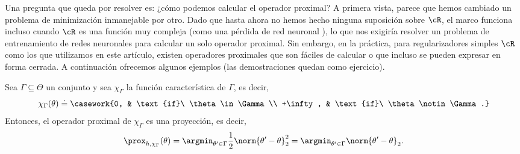 \documentclass[../../book-main_es.tex]{subfiles}
\begin{document}
Una pregunta que queda por resolver es: ¿cómo podemos calcular el operador proximal? A primera
vista, parece que hemos cambiado un problema de minimización inmanejable por
otro. Dado que hasta ahora no hemos hecho ninguna suposición sobre \(\cR\), el marco
funciona incluso cuando \(\cR\) es una función muy compleja (como una pérdida de red neuronal
), lo que nos exigiría resolver un problema de entrenamiento de redes neuronales
para calcular un solo operador proximal. Sin embargo, en la práctica, para
regularizadores simples \(\cR\) como los que utilizamos en este artículo, existen
operadores proximales que son fáciles de calcular o que incluso se 
pueden expresar en forma cerrada. A continuación ofrecemos
algunos ejemplos (las demostraciones quedan como ejercicio).

\begin{example}\label{example:prox-of-characteristic-function}
    Sea \(\Gamma \subseteq \Theta\) un conjunto y sea
    \(\chi_{\Gamma}\) la función característica de \(\Gamma\), es decir,
    \begin{equation}
        \chi_{\Gamma}(\theta) \doteq \casework{0, & \text{if}\ \theta
        \in \Gamma \\ +\infty, & \text{if}\ \theta \notin \Gamma.}
    \end{equation}
    Entonces, el operador proximal de \(\chi_{\Gamma}\) es una proyección, es decir,
    \begin{equation}
        \prox_{h, \chi_{\Gamma}}(\theta) = \argmin_{\theta^{\prime}
        \in \Gamma}\frac{1}{2}\norm{\theta^{\prime} - \theta}_{2}^{2}
        = \argmin_{\theta^{\prime} \in \Gamma}\norm{\theta^{\prime} -
        \theta}_{2}.
    \end{equation}
\end{example}
\end{document}
